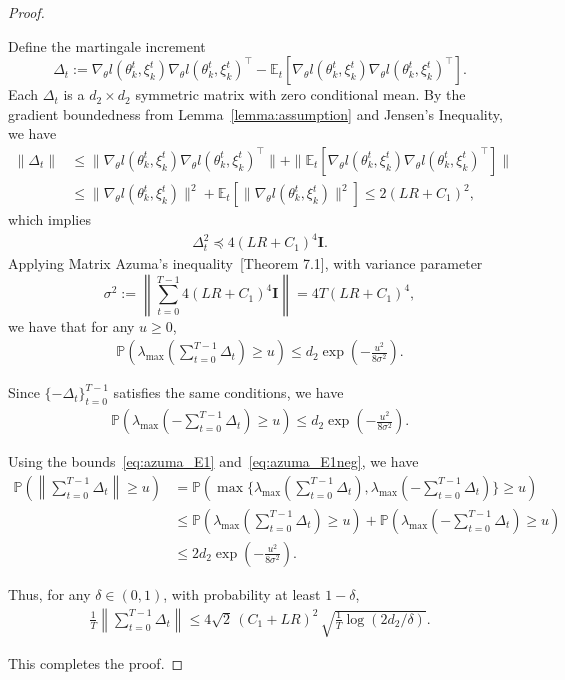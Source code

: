 \documentclass[11 pt]{article}
\begin{document}
\begin{proof}\label{app:proof_thm_Hinv_stochastic_error}


Define the martingale increment 
\[
\Delta_t := \nabla_\theta l(\theta_k^{t},\xi_k^t)\nabla_\theta l(\theta_k^{t},\xi_k^t)^\top - \mathbb{E}_{t}[\nabla_\theta l(\theta_k^{t},\xi_k^t)\nabla_\theta l(\theta_k^{t},\xi_k^t)^\top].
\]
Each $\Delta_t$ is a $d_2\times d_2$ symmetric matrix with zero conditional mean. By the gradient boundedness from Lemma~\ref{lemma:assumption} and Jensen's Inequality, we have
\begin{align*}
    \|\Delta_t\| &\leq \|\nabla_\theta l(\theta_k^{t},\xi_k^t)\nabla_\theta l(\theta_k^{t},\xi_k^t)^\top\| + \|\mathbb{E}_{t}[\nabla_\theta l(\theta_k^{t},\xi_k^t)\nabla_\theta l(\theta_k^{t},\xi_k^t)^\top] \| \\
    &\leq  \|\nabla_\theta l(\theta_k^t,\xi_k^t) \|^2+ \mathbb{E}_{t}[\|\nabla_\theta l(\theta_k^t,\xi_k^t)\|^2] \leq 2(LR+C_1)^2,
\end{align*}
which implies 
\begin{align*}
    \Delta_t^2 \preceq 4(LR+C_1)^4 \mathbf{I}.
\end{align*}
Applying Matrix Azuma's inequality~\cite{tropp2012user}[Theorem 7.1], with variance parameter 
\[
\sigma^2:=\left\|\sum_{t=0}^{T-1} 4(LR+C_1)^4\mathbf{I} \right\|=4T(LR+C_1)^4,
\] 
we have that for any $u\geq 0$,
\begin{align}\label{eq:azuma_E1}
    \mathbb{P}\left( \lambda_{\text{max}}\left(\sum_{t=0}^{T-1}\Delta_t\right)\geq u\right)\leq d_2 \exp\left(-\frac{u^2}{8\sigma^2}\right).
\end{align}

Since $\{-\Delta_t\}_{t=0}^{T-1}$ satisfies the same conditions, we have
\begin{align}\label{eq:azuma_E1neg}
    \mathbb{P}\left( \lambda_{\text{max}}\left(-\sum_{t=0}^{T-1}\Delta_t\right)\geq u\right)\leq d_2 \exp\left(-\frac{u^2}{8\sigma^2}\right).
\end{align}

Using the bounds~\eqref{eq:azuma_E1} and~\eqref{eq:azuma_E1neg}, we have
\begin{align*}
    \mathbb{P}\left( \left\| \sum_{t=0}^{T-1}\Delta_t \right \|\geq u\right)&= \mathbb{P}\left( \max\{\lambda_{\text{max}}(\sum_{t=0}^{T-1}\Delta_t),\lambda_{\text{max}}(-\sum_{t=0}^{T-1}\Delta_t)\}\geq u\right)\tag{symmetry of $\Delta_t$} \\
    &\leq \mathbb{P}\left( \lambda_{\text{max}}\left(\sum_{t=0}^{T-1}\Delta_t\right)\geq u\right) + \mathbb{P}\left( \lambda_{\text{max}}\left(-\sum_{t=0}^{T-1}\Delta_t\right)\geq u\right) \tag{Union Bound} \\
    &\leq 2d_2 \exp\left(-\frac{u^2}{8\sigma^2}\right).
\end{align*}

Thus, for any $\delta \in (0,1)$, with probability at least $1-\delta$,
\begin{align*}
    \frac1T \left\| \sum_{t=0}^{T-1} \Delta_t\right\|  \leq 4\sqrt{2}\, (C_1 + LR)^2\, \sqrt{\frac{1}{T}\log\left(2d_2/\delta\right)}.
\end{align*}

This completes the proof.
\end{proof}
\end{document}
